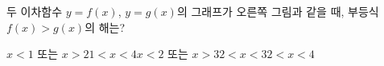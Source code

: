 \hspace*{2mm}\begin{minipage}[t]{\dimexpr\linewidth-2mm\relax}\vspace{0pt}
\noindent\begin{minipage}[t]{0.58\linewidth}\vspace{0pt}\raggedright 두 이차함수 $y=f(x)$, $y=g(x)$의 그래프가 오른쪽 그림과 같을 때, 부등식 $f(x)>g(x)$의 해는?\end{minipage}\hfill\begin{minipage}[t]{0.4\linewidth}\vspace{0pt}\centering \resizebox{\ifdim\width>\linewidth\linewidth\else\width\fi}{!}{}\end{minipage}\par
\begin{choicesv}{$x<1$ 또는 $x>2$}{$1<x<4$}{$x<2$ 또는 $x>3$}{$2<x<3$}{$2<x<4$}\end{choicesv}\end{minipage}
